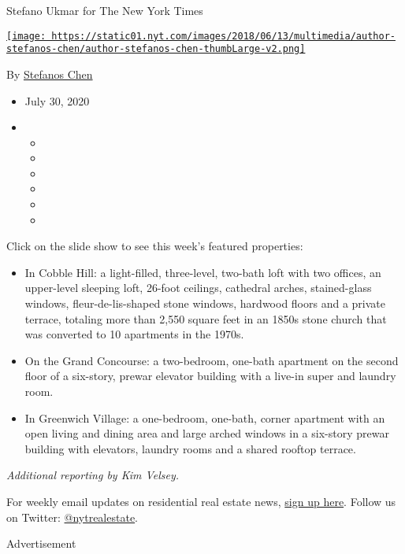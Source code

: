 Stefano Ukmar for The New York Times

\href{https://www.nytimes.com/by/stefanos-chen}{\texttt{[image: https://static01.nyt.com/images/2018/06/13/multimedia/author-stefanos-chen/author-stefanos-chen-thumbLarge-v2.png]}}

By \href{https://www.nytimes.com/by/stefanos-chen}{Stefanos Chen}

\begin{itemize}
\item
  July 30, 2020
\item
  \begin{itemize}
  \item
  \item
  \item
  \item
  \item
  \item
  \end{itemize}
\end{itemize}

Click on the slide show to see this week's featured properties:

\begin{itemize}
\item
  In Cobble Hill: a light-filled, three-level, two-bath loft with two
  offices, an upper-level sleeping loft, 26-foot ceilings, cathedral
  arches, stained-glass windows, fleur-de-lis-shaped stone windows,
  hardwood floors and a private terrace, totaling more than 2,550 square
  feet in an 1850s stone church that was converted to 10 apartments in
  the 1970s.
\item
  On the Grand Concourse: a two-bedroom, one-bath apartment on the
  second floor of a six-story, prewar elevator building with a live-in
  super and laundry room.
\item
  In Greenwich Village: a one-bedroom, one-bath, corner apartment with
  an open living and dining area and large arched windows in a six-story
  prewar building with elevators, laundry rooms and a shared rooftop
  terrace.
\end{itemize}

\emph{Additional reporting by Kim Velsey.}

For weekly email updates on residential real estate news,
\href{http://www.nytimes.com/newsletters/realestate/}{sign up here}.
Follow us on Twitter:
\href{https://twitter.com/nytrealestate}{@nytrealestate}.

Advertisement

